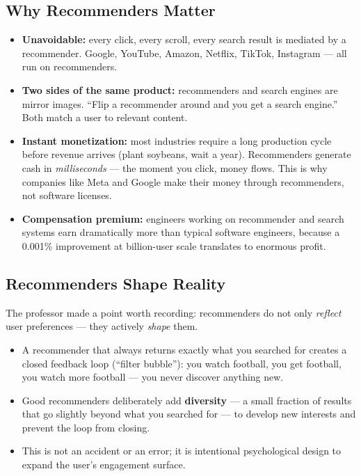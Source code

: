 \documentclass[11pt]{article}
\begin{document}
\subsection{Why Recommenders Matter}
\begin{itemize}
    \item \textbf{Unavoidable:} every click, every scroll, every search
      result is mediated by a recommender. Google, YouTube, Amazon, Netflix,
      TikTok, Instagram --- all run on recommenders.
    \item \textbf{Two sides of the same product:} recommenders and search
      engines are mirror images. ``Flip a recommender around and you get a
      search engine.'' Both match a user to relevant content.
    \item \textbf{Instant monetization:} most industries require a long
      production cycle before revenue arrives (plant soybeans, wait a year).
      Recommenders generate cash in \textit{milliseconds} --- the moment
      you click, money flows. This is why companies like Meta and Google make
      their money through recommenders, not software licenses.
    \item \textbf{Compensation premium:} engineers working on recommender
      and search systems earn dramatically more than typical software
      engineers, because a 0.001\% improvement at billion-user scale
      translates to enormous profit.
\end{itemize}

\subsection{Recommenders Shape Reality}
The professor made a point worth recording: recommenders do not only
\emph{reflect} user preferences --- they actively \emph{shape} them.
\begin{itemize}
    \item A recommender that always returns exactly what you searched for
      creates a closed feedback loop (``filter bubble''): you watch football,
      you get football, you watch more football --- you never discover
      anything new.
    \item Good recommenders deliberately add \textbf{diversity} --- a small
      fraction of results that go slightly beyond what you searched for ---
      to develop new interests and prevent the loop from closing.
    \item This is not an accident or an error; it is intentional psychological
      design to expand the user's engagement surface.
\end{itemize}
\end{document}
